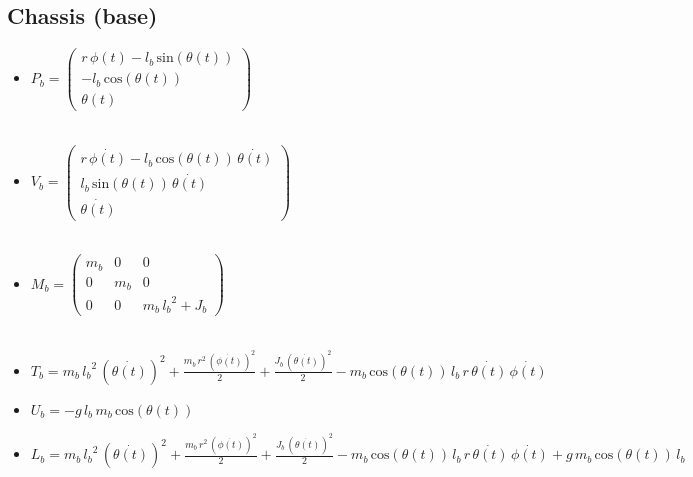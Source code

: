 \subsection{Chassis (base)}
\begin{itemize}
	
	\item \textbf{$P_b = \left(\begin{array}{c}
		r\,\phi \left(t\right)-l_b \,\mathrm{sin}\left(\theta \left(t\right)\right)\\
		-l_b \,\mathrm{cos}\left(\theta \left(t\right)\right)\\
		\theta \left(t\right)
		\end{array}\right)$}
	\\\\
	\item \textbf{$V_b = \left(\begin{array}{c}
		r\,\dot{\phi \left(t\right)}-l_b \,\mathrm{cos}\left(\theta \left(t\right)\right)\,\dot{\theta \left(t\right)}\\
		l_b \,\mathrm{sin}\left(\theta \left(t\right)\right)\,\dot{\theta \left(t\right)}\\
		\dot{\theta \left(t\right)}
		\end{array}\right)$}
	\\\\
	\item \textbf{$M_b = \left(\begin{array}{ccc}
		m_b  & 0 & 0\\
		0 & m_b  & 0\\
		0 & 0 & m_b \,{l_b }^2 +J_b 
		\end{array}\right)$}
	\\\\
	\item \textbf{$T_b = m_b \,{l_b }^2 \,{{\left(\dot{\theta \left(t\right)}\right)}}^2 +\frac{m_b \,r^2 \,{{\left(\dot{\phi \left(t\right)}\right)}}^2 }{2}+\frac{J_b \,{{\left(\dot{\theta \left(t\right)}\right)}}^2 }{2}-m_b \,\mathrm{cos}\left(\theta \left(t\right)\right)\,l_b \,r\,\dot{\theta \left(t\right)}\,\dot{\phi \left(t\right)}$}
	\\
	\item \textbf{$U_b = -g\,l_b \,m_b \,\mathrm{cos}\left(\theta \left(t\right)\right)$}
	\\
	\item \textbf{$L_b = m_b \,{l_b }^2 \,{{\left(\dot{\theta \left(t\right)}\right)}}^2 +\frac{m_b \,r^2 \,{{\left(\dot{\phi \left(t\right)}\right)}}^2 }{2}+\frac{J_b \,{{\left(\dot{\theta \left(t\right)}\right)}}^2 }{2}-m_b \,\mathrm{cos}\left(\theta \left(t\right)\right)\,l_b \,r\,\dot{\theta \left(t\right)}\,\dot{\phi \left(t\right)}+g\,m_b \,\mathrm{cos}\left(\theta \left(t\right)\right)\,l_b$}
\end{itemize}
